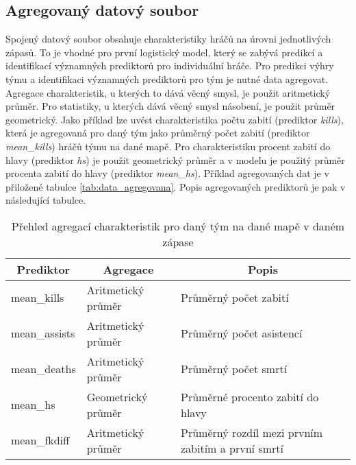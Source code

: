 \subsection{Agregovaný datový soubor}
Spojený datový soubor obsahuje charakteristiky hráčů na úrovni jednotlivých zápasů. To je vhodné pro první logistický model, který se zabývá predikcí a identifikací
významných prediktorů pro individuální hráče. Pro predikci výhry týmu a identifikaci významných prediktorů pro tým je nutné data agregovat. Agregace charakteristik, u kterých
to dává věcný smysl, je použit aritmetický průměr. Pro statistiky, u kterých dává věcný smysl násobení, je použit průměr geometrický. Jako příklad lze uvést charakteristika 
počtu zabití (prediktor \textit{kills}), která je agregovaná pro daný tým jako průměrný počet zabití (prediktor \textit{mean\_kills}) hráčů týmu na dané mapě. Pro charakteristiku
procent zabití do hlavy (prediktor \textit{hs}) je použit geometrický průměr a v modelu je použitý průměr procenta zabití do hlavy (prediktor \textit{mean\_hs}).
Příklad agregovaných dat je v přiložené tabulce \ref{tab:data_agregovana}. Popis agregovaných prediktorů je pak v následující tabulce.

\begin{table}[H]
    \centering
    \caption{Přehled agregací charakteristik pro daný tým na dané mapě v daném zápase}
    \begin{tabular}{|l|l|l|}
    \hline
    \multicolumn{1}{|c|}{Prediktor} & \multicolumn{1}{c|}{Agregace} & \multicolumn{1}{c|}{Popis}                        \\ \hline
    mean\_kills                     & Aritmetický průměr            & Průměrný počet zabití                             \\ \hline
    mean\_assists                   & Aritmetický průměr            & Průměrný počet asistencí                          \\ \hline
    mean\_deaths                    & Aritmetický průměr            & Průměrný počet smrtí                              \\ \hline
    mean\_hs                        & Geometrický průměr            & Průměrné procento zabití do hlavy                 \\ \hline
    mean\_fkdiff                    & Aritmetický průměr            & Průměrný rozdíl mezi prvním zabitím a první smrtí \\ \hline
    \end{tabular}
\end{table}

